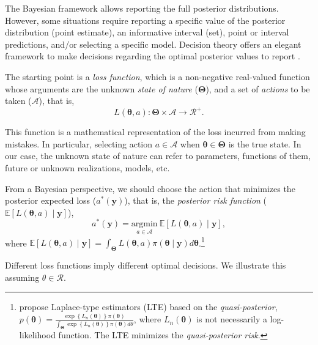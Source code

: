 The Bayesian framework allows reporting the full posterior distributions. However, some situations require reporting a specific value of the posterior distribution (point estimate), an informative interval (set), point or interval predictions, and/or selecting a specific model. Decision theory offers an elegant framework to make decisions regarding the optimal posterior values to report \cite{berger2013statistical}.

The starting point is a \textit{loss function}, which is a non-negative real-valued function whose arguments are the unknown \textit{state of nature} ($\mathbf{\Theta}$), and a set of \textit{actions} to be taken ($\mathcal{A}$), that is, 
\begin{equation*}
	L(\bm{\theta}, a):\mathbf{\Theta}\times \mathcal{A}\rightarrow \mathcal{R}^+.
\end{equation*}

This function is a mathematical representation of the loss incurred from making mistakes. In particular, selecting action $a\in\mathcal{A}$ when $\bm{\theta}\in\mathbf{\Theta}$ is the true state. In our case, the unknown state of nature can refer to parameters, functions of them, future or unknown realizations, models, etc.

From a Bayesian perspective, we should choose the action that minimizes the posterior expected loss ($a^*(\mathbf{y})$), that is, the \textit{posterior risk function} ($\mathbb{E}[L(\bm{\theta}, a)\mid \mathbf{y}]$),
\begin{equation*}
	a^*(\mathbf{y})=\underset{a \in \mathcal{A}}{\mathrm{argmin}} \  \mathbb{E}[L(\bm{\theta}, a)\mid \mathbf{y}], 
\end{equation*}
where $\mathbb{E}[L(\bm{\theta}, a)\mid \mathbf{y}] = \int_{\mathbf{\Theta}} L(\bm{\theta}, a)\pi(\bm{\theta}\mid \mathbf{y})d\bm{\theta}$.\footnote{\cite{Chernozhukov2003} propose Laplace-type estimators (LTE) based on the \textit{quasi-posterior}, $p(\bm{\theta})=\frac{\exp\left\{L_n(\bm{\theta})\right\}\pi(\bm{\theta})}{\int_{\mathbf{\Theta}}\exp\left\{L_n(\bm{\theta})\right\}\pi(\bm{\theta})d\theta}$, where $L_n(\bm{\theta})$ is not necessarily a log-likelihood function. The LTE minimizes the \textit{quasi-posterior risk}.}

Different loss functions imply different optimal decisions. We illustrate this assuming $\theta \in \mathcal{R}$.

